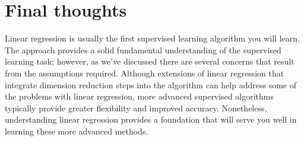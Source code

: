\documentclass[]{krantz}
\begin{document}
\hypertarget{final-thoughts}{%
\section{Final thoughts}\label{final-thoughts}}

Linear regression is usually the first supervised learning algorithm you will learn. The approach provides a solid fundamental understanding of the supervised learning task; however, as we've discussed there are several concerns that result from the assumptions required. Although extensions of linear regression that integrate dimension reduction steps into the algorithm can help address some of the problems with linear regression, more advanced supervised algorithms typically provide greater flexibility and improved accuracy. Nonetheless, understanding linear regression provides a foundation that will serve you well in learning these more advanced methods.



\backmatter
\printindex
\end{document}
